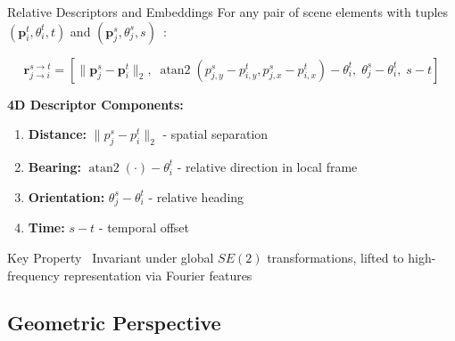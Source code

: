 \documentclass[10pt,aspectratio=169]{beamer}
\DeclareMathOperator{\atan}{atan2}
\begin{document}
\begin{frame}{Relative Descriptors and Embeddings}
For any pair of scene elements with tuples $(\mathbf{p}_i^t, \theta_i^t, t)$ and $(\mathbf{p}_j^s, \theta_j^s, s)$~\cite{qcnetZhou2023}:

\begin{equation}
\mathbf{r}_{j\to i}^{s\to t} = \left[
    \|\mathbf{p}_j^s-\mathbf{p}_i^t\|_2,\;
    \atan(p_{j,y}^s-p_{i,y}^t, p_{j,x}^s-p_{i,x}^t)-\theta_i^t,\;
    \theta_j^s-\theta_i^t,\;
    s-t
\right]
\end{equation}

\vspace{0.5cm}

\textbf{4D Descriptor Components:}    \begin{enumerate}
    \item \textbf{Distance:} $\|p_j^s-p_i^t\|_2$ - spatial separation
    \item \textbf{Bearing:} $\atan(\cdot)-\theta_i^t$ - relative direction in local frame
    \item \textbf{Orientation:} $\theta_j^s-\theta_i^t$ - relative heading
    \item \textbf{Time:} $s-t$ - temporal offset
\end{enumerate}

\begin{block}{Key Property~\cite{qcnetZhou2023}}
Invariant under global $SE(2)$ transformations, lifted to high-frequency representation via Fourier features
\end{block}
\end{frame}

\subsection{Geometric Perspective}
\end{document}
